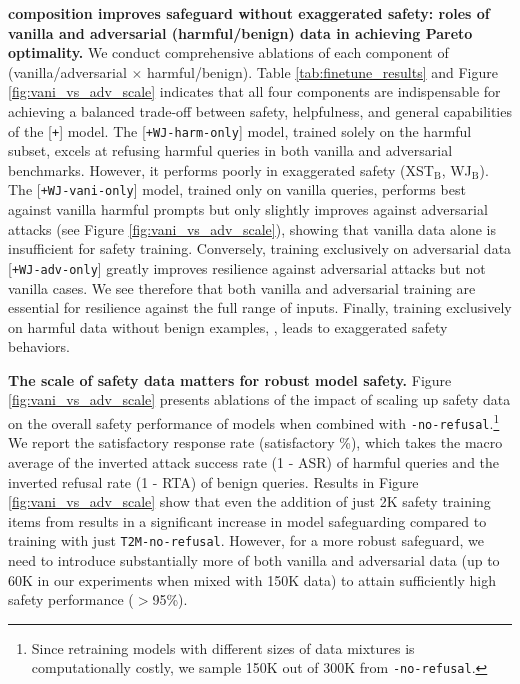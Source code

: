 \textbf{\dataset composition improves safeguard without exaggerated safety: roles of vanilla and adversarial (harmful/benign) data in achieving Pareto optimality.}
We conduct comprehensive ablations of each component of \dataset (vanilla/adversarial $\times$ harmful/benign). Table \ref{tab:finetune_results} and Figure \ref{fig:vani_vs_adv_scale} indicates that all four components are indispensable for achieving a balanced trade-off between safety, helpfulness, and general capabilities of the [\texttt{+\dataset}] model. 
The [\texttt{+WJ-harm-only}] model, trained solely on the harmful subset, excels at refusing harmful queries in both vanilla and adversarial benchmarks. However, it performs poorly in exaggerated safety (XST${_\text{B}}$, WJ${_\text{B}}$). The [\texttt{+WJ-vani-only}] model, trained only on vanilla queries, performs best against vanilla harmful prompts but only slightly improves against adversarial attacks (see Figure \ref{fig:vani_vs_adv_scale}), showing that vanilla data alone is insufficient for safety training. 
Conversely, training exclusively on adversarial data [\texttt{+WJ-adv-only}] greatly improves resilience against adversarial attacks but not vanilla cases. We see therefore that both vanilla and adversarial training are essential for resilience against the full range of inputs. Finally, training exclusively on harmful data without benign examples, , leads to exaggerated safety behaviors. 

\textbf{The scale of safety data matters for robust model safety.}
Figure \ref{fig:vani_vs_adv_scale} presents ablations of the impact of scaling up safety data on the overall safety performance of models when combined with \texttt{\tulumixshort-no-refusal}.\footnote{Since retraining models with different sizes of data mixtures is computationally costly, we sample 150K out of 300K from \texttt{\tulumixshort-no-refusal}.} We report the satisfactory response rate (satisfactory \%), which takes the macro average of the inverted attack success rate (1 - ASR) of harmful queries and the inverted refusal rate (1 - RTA) of benign queries.
Results in Figure \ref{fig:vani_vs_adv_scale} show that even the addition of just 2K safety training items from \dataset results in a significant increase in model safeguarding compared to training with just \texttt{T2M-no-refusal}. However, for a more robust safeguard, we need to introduce substantially more of both vanilla and adversarial data (up to 60K in our experiments when mixed with 150K \texttt{\tulumix} data) to attain sufficiently high safety performance ($>$95\%).

